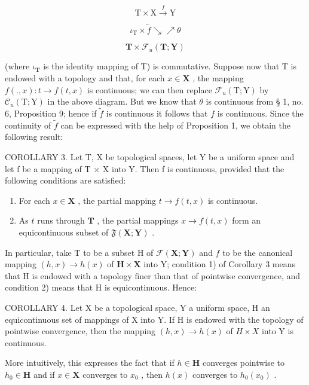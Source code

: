 \[
\mathrm{T} \times \mathrm{X} \xrightarrow {f} \mathrm{Y}
\]

\[
\iota_ {\mathrm{T}} \times \tilde {f} \searrow \nearrow \theta
\]

\[
\mathbf {T} \times \mathcal {F} _ {u} (\mathbf {T}; \mathbf {Y})
\]

(where \(\iota_{\mathbf{T}}\) is the identity mapping of T) is commutative. Suppose now that T is endowed with a topology and that, for each \(x \in \mathbf{X}\) , the mapping \(f(., x): t \to f(t, x)\) is continuous; we can then replace \(\mathcal{F}_{u}(\mathrm{T}; \mathrm{Y})\) by \(\mathcal{C}_{u}(\mathrm{T}; \mathrm{Y})\) in the above diagram. But we know that \(\theta\) is continuous from § 1, no. 6, Proposition 9; hence if \(\tilde{f}\) is continuous it follows that \(f\) is continuous. Since the continuity of \(\tilde{f}\) can be expressed with the help of Proposition 1, we obtain the following result:

COROLLARY 3. Let T, X be topological spaces, let Y be a uniform space and let f be a mapping of T × X into Y. Then f is continuous, provided that the following conditions are satisfied:

\begin{enumerate}
\def\labelenumi{\arabic{enumi})}
\item
  For each \(x \in \mathbf{X}\) , the partial mapping \(t \to f(t, x)\) is continuous.
\item
  As \(t\) runs through \(\mathbf{T}\) , the partial mappings \(x \to f(t, x)\) form an equicontinuous subset of \(\mathfrak{F}(\mathbf{X}; \mathbf{Y})\) .
\end{enumerate}

In particular, take T to be a subset H of \(\mathcal{F}(\mathbf{X};\mathbf{Y})\) and \(f\) to be the canonical mapping \((h,x)\to h(x)\) of \(\mathbf{H}\times \mathbf{X}\) into Y; condition 1) of Corollary 3 means that H is endowed with a topology finer than that of pointwise convergence, and condition 2) means that H is equicontinuous. Hence:

COROLLARY 4. Let X be a topological space, Y a uniform space, H an equicontinuous set of mappings of X into Y. If H is endowed with the topology of pointwise convergence, then the mapping \((h, x) \to h(x)\) of \(H \times X\) into Y is continuous.

More intuitively, this expresses the fact that if \(h \in \mathbf{H}\) converges pointwise to \(h_0 \in \mathbf{H}\) and if \(x \in \mathbf{X}\) converges to \(x_0\) , then \(h(x)\) converges to \(h_0(x_0)\) .

